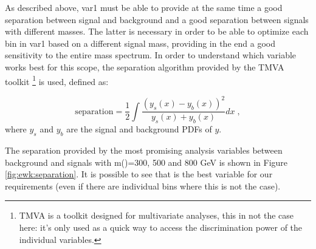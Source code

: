 \noindent As described above, var1 must be able to provide at the same time a good separation between signal and background 
and a good separation between signals with different \hino masses. 
The latter is necessary in order to be able to optimize each bin in var1 based on a different signal mass, 
providing in the end a good sensitivity to the entire mass spectrum. 
In order to understand which variable works best for this scope, the separation algorithm provided by the TMVA toolkit \footnote{TMVA is a toolkit designed for multivariate analyses, this in not the case here: it's only used as a quick way to access the discrimination power of the individual variables.} \cite{Hocker:2007ht} is used, defined as:

\begin{equation}
          \mathrm{separation} = \frac{1}{2} \int\frac{\left(y_s(x) - y_b(x)\right)^2}{y_s(x) + y_b(x)} dx \; , 
\label{eq:separation}
\end{equation}
\noindent where $y_s$ and $y_b$ are the signal and background PDFs of $y$. 

The separation provided by the most promising analysis variables between background and 
signals with m(\hino)=300, 500 and 800 GeV is shown in Figure \ref{fig:ewk:separation}.
It is possible to see that \meffb is the best variable for our requirements (even if there are individual bins where this is not the case).

